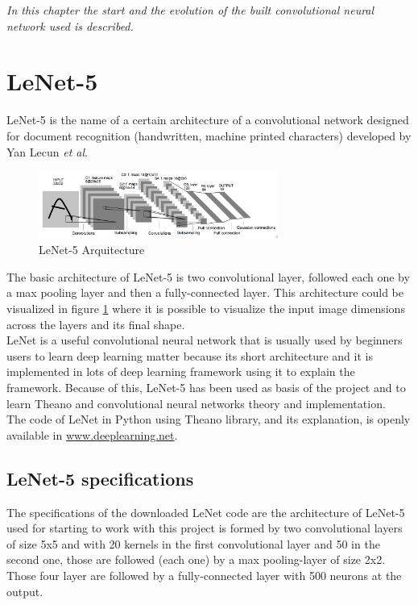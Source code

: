 \minitoc
\mtcskip

\begin{small}
\emph{In this chapter the start and the evolution of the built convolutional neural network used is described.\\}
\end{small}

\section{LeNet-5}
LeNet-5 \cite{Lenet5} is the name of a certain architecture of a convolutional network designed for document recognition (handwritten, machine printed characters) developed by Yan Lecun \textit{et al}.\\

\begin{figure}[htb]
  \centering
  \includegraphics[width=0.7\textwidth]{images/images_lenet/LenetArquitectura.png}
  \caption{LeNet-5 Arquitecture}
  \label{Lenet5Arquitectura}
\end{figure}

The basic architecture of LeNet-5 is two convolutional layer, followed each one by a max pooling layer and then a fully-connected layer. This architecture could be visualized in figure \ref{Lenet5Arquitectura} where it is possible to visualize the input image dimensions across the layers and its final shape.\\

LeNet is a useful convolutional neural network that is usually used by beginners users to learn deep learning matter because its short architecture and it is implemented in lots of deep learning framework using it to explain the framework. Because of this, LeNet-5 has been used as basis of the project and to learn Theano and convolutional neural networks theory and implementation.\\

The code of LeNet in Python using Theano library, and its explanation, is openly available in \url{www.deeplearning.net}.\\

\subsection{LeNet-5 specifications}
The specifications of the downloaded LeNet code are the architecture of LeNet-5 used for starting to work with this project is formed by two convolutional layers of size 5x5 and with 20 kernels in the first convolutional layer and 50 in the second one, those are followed (each one) by a max pooling-layer of size 2x2. Those four layer are followed by a fully-connected layer with 500 neurons at the output.\\

